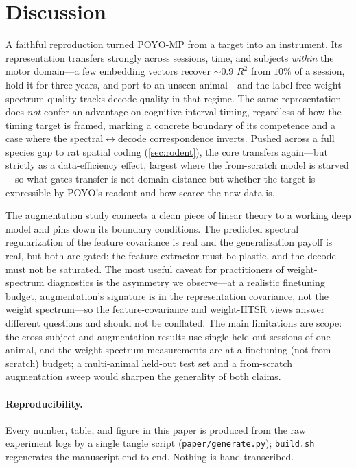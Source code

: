 \documentclass{article} %
\newcommand{\poyo}{POYO\xspace}
\newcommand{\poymp}{POYO-MP\xspace}
\newcommand{\rtwo}{$R^2$\xspace}
\begin{document}
\section{Discussion}
\label{sec:discussion}
A faithful reproduction turned \poymp from a target into an instrument. Its representation
transfers strongly across sessions, time, and subjects \emph{within} the motor domain---a few
embedding vectors recover ${\sim}0.9$ \rtwo{} from $10\%$ of a session, hold it for three years,
and port to an unseen animal---and the label-free weight-spectrum quality tracks decode quality
in that regime. The same representation does \emph{not} confer an advantage on cognitive
interval timing, regardless of how the timing target is framed, marking a concrete boundary of
its competence and a case where the spectral$\leftrightarrow$decode correspondence inverts. Pushed
across a full species gap to rat spatial coding (\cref{sec:rodent}), the core transfers
again---but strictly as a data-efficiency effect, largest where the from-scratch model is
starved---so what gates transfer is not domain distance but whether the target is expressible by
\poyo's readout and how scarce the new data is.

The augmentation study connects a clean piece of linear theory \citep{lin2024augmentation} to a
working deep model and pins down its boundary conditions. The predicted spectral regularization
of the feature covariance is real and the generalization payoff is real, but both are gated:
the feature extractor must be plastic, and the decode must not be saturated. The most useful
caveat for practitioners of weight-spectrum diagnostics is the asymmetry we observe---at a
realistic finetuning budget, augmentation's signature is in the representation covariance, not
the weight spectrum---so the feature-covariance and weight-HTSR views answer different
questions and should not be conflated. The main limitations are scope: the cross-subject and
augmentation results use single held-out sessions of one animal, and the weight-spectrum
measurements are at a finetuning (not from-scratch) budget; a multi-animal held-out test set and
a from-scratch augmentation sweep would sharpen the generality of both claims.

\paragraph{Reproducibility.} Every number, table, and figure in this paper is produced from the
raw experiment logs by a single tangle script (\texttt{paper/generate.py}); \texttt{build.sh}
regenerates the manuscript end-to-end. Nothing is hand-transcribed.



\end{document}
